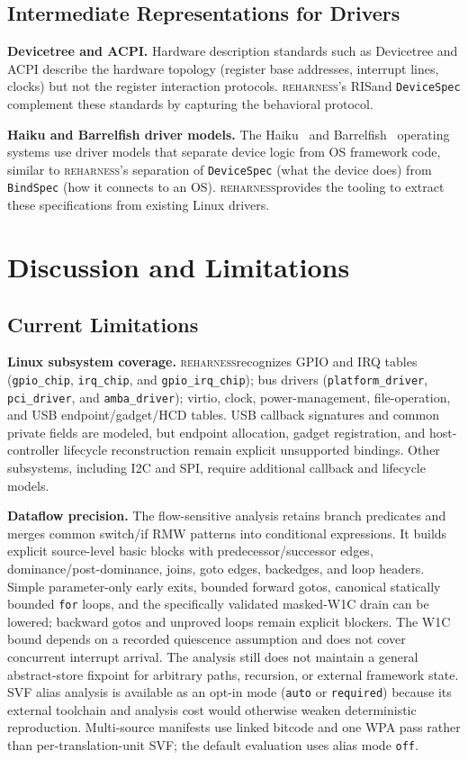 \documentclass[sigconf,review]{acmart}
\newcommand{\reharness}{\textsc{reharness}}
\newcommand{\rislang}{RIS}
\begin{document}
\subsection{Intermediate Representations for Drivers}

\textbf{Devicetree and ACPI.} Hardware description standards such as Devicetree and ACPI describe the hardware topology (register base addresses, interrupt lines, clocks) but not the register interaction protocols. \reharness's \rislang and \texttt{DeviceSpec} complement these standards by capturing the behavioral protocol.

\textbf{Haiku and Barrelfish driver models.} The Haiku~\cite{haiku} and Barrelfish~\cite{baumann2009multikernel} operating systems use driver models that separate device logic from OS framework code, similar to \reharness's separation of \texttt{DeviceSpec} (what the device does) from \texttt{BindSpec} (how it connects to an OS). \reharness provides the tooling to extract these specifications from existing Linux drivers.

\section{Discussion and Limitations}
\label{sec:discussion}

\subsection{Current Limitations}

\textbf{Linux subsystem coverage.} \reharness recognizes GPIO and IRQ tables (\texttt{gpio\_chip}, \texttt{irq\_chip}, and \texttt{gpio\_irq\_chip}); bus drivers (\texttt{platform\_driver}, \texttt{pci\_driver}, and \texttt{amba\_driver}); virtio, clock, power-management, file-operation, and USB endpoint/gadget/HCD tables. USB callback signatures and common private fields are modeled, but endpoint allocation, gadget registration, and host-controller lifecycle reconstruction remain explicit unsupported bindings. Other subsystems, including I2C and SPI, require additional callback and lifecycle models.

\textbf{Dataflow precision.} The flow-sensitive analysis retains branch predicates and merges common switch/if RMW patterns into conditional expressions. It builds explicit source-level basic blocks with predecessor/successor edges, dominance/post-dominance, joins, goto edges, backedges, and loop headers. Simple parameter-only early exits, bounded forward gotos, canonical statically bounded \texttt{for} loops, and the specifically validated masked-W1C drain can be lowered; backward gotos and unproved loops remain explicit blockers. The W1C bound depends on a recorded quiescence assumption and does not cover concurrent interrupt arrival. The analysis still does not maintain a general abstract-store fixpoint for arbitrary paths, recursion, or external framework state. SVF alias analysis is available as an opt-in mode (\texttt{auto} or \texttt{required}) because its external toolchain and analysis cost would otherwise weaken deterministic reproduction. Multi-source manifests use linked bitcode and one WPA pass rather than per-translation-unit SVF; the default evaluation uses alias mode \texttt{off}.
\end{document}
